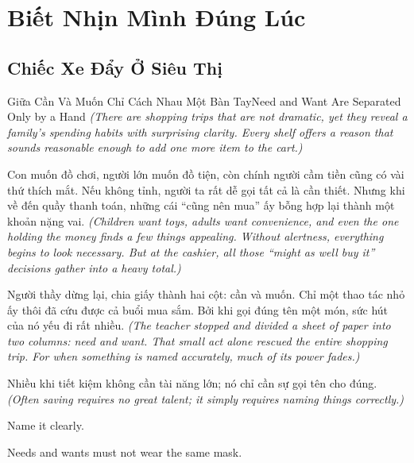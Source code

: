\chapter{Biết Nhịn Mình Đúng Lúc}

\section{Chiếc Xe Đẩy Ở Siêu Thị}
\begin{truyen}{Giữa Cần Và Muốn Chỉ Cách Nhau Một Bàn Tay}{Need and Want Are Separated Only by a Hand}
\textit{(There are shopping trips that are not dramatic, yet they reveal a family’s spending habits with surprising clarity. Every shelf offers a reason that sounds reasonable enough to add one more item to the cart.)}

Con muốn đồ chơi, người lớn muốn đồ tiện, còn chính người cầm tiền cũng có vài thứ thích mắt. Nếu không tỉnh, người ta rất dễ gọi tất cả là cần thiết. Nhưng khi về đến quầy thanh toán, những cái ``cũng nên mua'' ấy bỗng hợp lại thành một khoản nặng vai.
\textit{(Children want toys, adults want convenience, and even the one holding the money finds a few things appealing. Without alertness, everything begins to look necessary. But at the cashier, all those ``might as well buy it'' decisions gather into a heavy total.)}

Người thầy dừng lại, chia giấy thành hai cột: cần và muốn. Chỉ một thao tác nhỏ ấy thôi đã cứu được cả buổi mua sắm. Bởi khi gọi đúng tên một món, sức hút của nó yếu đi rất nhiều.
\textit{(The teacher stopped and divided a sheet of paper into two columns: need and want. That small act alone rescued the entire shopping trip. For when something is named accurately, much of its power fades.)}
\end{truyen}

\begin{baihoc}
Nhiều khi tiết kiệm không cần tài năng lớn; nó chỉ cần sự gọi tên cho đúng.
\textit{(Often saving requires no great talent; it simply requires naming things correctly.)}
\end{baihoc}

\begin{ghinhoanh}
Name it clearly.

Needs and wants must not wear the same mask.
\end{ghinhoanh}


